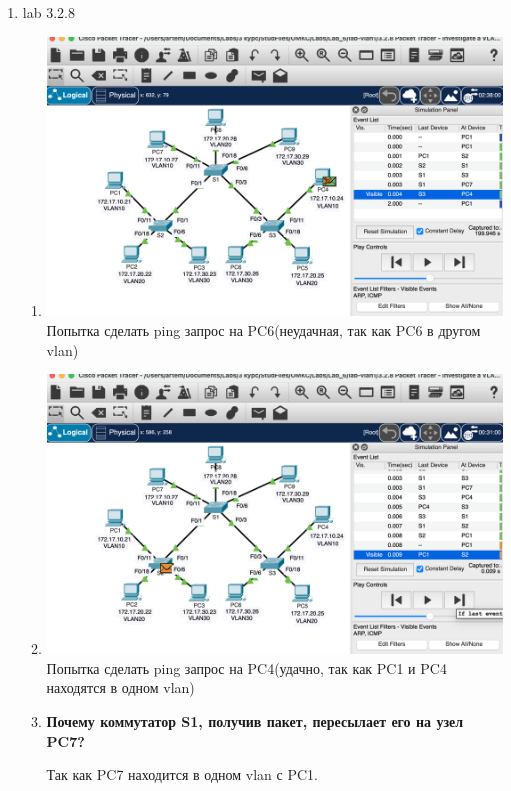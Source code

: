 \documentclass[a4paper,14pt]{extarticle}
\begin{document}
\begin{enumerate}
\begin{enumerate}
        \end{enumerate}
        \newpage
        \item lab 3.2.8
        \begin{enumerate}
            \item 
                \begin{center}
                    \includegraphics[scale=0.4]{pics/3.2.8_1.png}
                    \singlespacing
                    Попытка сделать ping запрос на PC6(неудачная, так как PC6 в другом vlan)
                \end{center}
            \item 
                \begin{center}
                    \includegraphics[scale=0.4]{pics/3.2.8_2.png}
                    \singlespacing
                    Попытка сделать ping запрос на PC4(удачно, так как PC1 и PC4 находятся в одном vlan)
                \end{center}
            \item \textbf{Почему коммутатор S1, получив пакет, пересылает его на узел PC7?}\par
            Так как PC7 находится в одном vlan с PC1.


\end{enumerate}
\end{enumerate}
\end{document}
